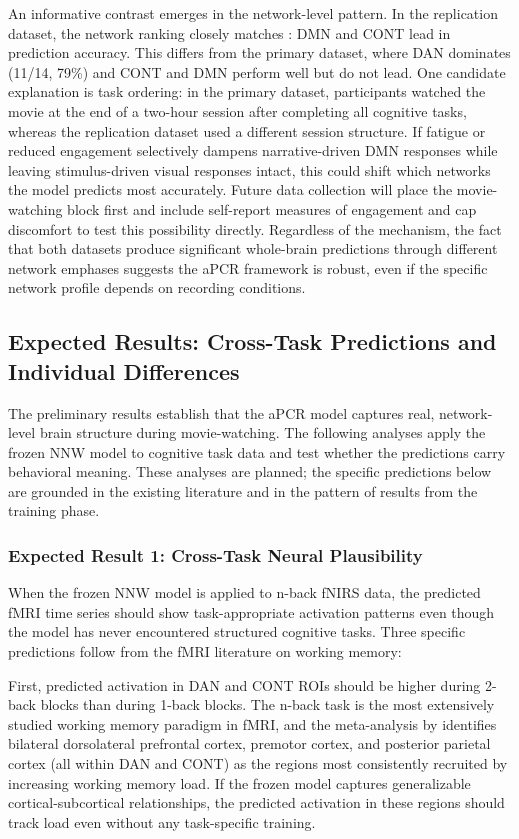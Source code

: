 An informative contrast emerges in the network-level pattern. In the replication dataset, the network ranking closely matches \citet{gao2025}: DMN and CONT lead in prediction accuracy. This differs from the primary dataset, where DAN dominates (11/14, 79\%) and CONT and DMN perform well but do not lead. One candidate explanation is task ordering: in the primary dataset, participants watched the movie at the end of a two-hour session after completing all cognitive tasks, whereas the replication dataset used a different session structure. If fatigue or reduced engagement selectively dampens narrative-driven DMN responses while leaving stimulus-driven visual responses intact, this could shift which networks the model predicts most accurately. Future data collection will place the movie-watching block first and include self-report measures of engagement and cap discomfort to test this possibility directly. Regardless of the mechanism, the fact that both datasets produce significant whole-brain predictions through different network emphases suggests the aPCR framework is robust, even if the specific network profile depends on recording conditions.


\subsection{Expected Results: Cross-Task Predictions and Individual Differences}

The preliminary results establish that the aPCR model captures real, network-level brain structure during movie-watching. The following analyses apply the frozen NNW model to cognitive task data and test whether the predictions carry behavioral meaning. These analyses are planned; the specific predictions below are grounded in the existing literature and in the pattern of results from the training phase.

\subsubsection{Expected Result 1: Cross-Task Neural Plausibility}

When the frozen NNW model is applied to n-back fNIRS data, the predicted fMRI time series should show task-appropriate activation patterns even though the model has never encountered structured cognitive tasks. Three specific predictions follow from the fMRI literature on working memory:

First, predicted activation in DAN and CONT ROIs should be higher during 2-back blocks than during 1-back blocks. The n-back task is the most extensively studied working memory paradigm in fMRI, and the meta-analysis by \citet{owen2005} identifies bilateral dorsolateral prefrontal cortex, premotor cortex, and posterior parietal cortex (all within DAN and CONT) as the regions most consistently recruited by increasing working memory load. If the frozen model captures generalizable cortical-subcortical relationships, the predicted activation in these regions should track load even without any task-specific training.

